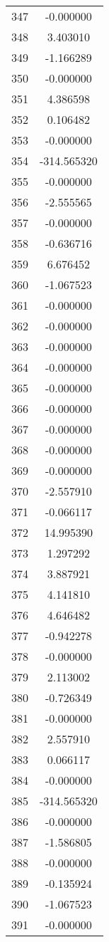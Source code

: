 \documentclass[12pt]{article}
\begin{document}
\begin{longtable}{@{}cc@{}}
347 & -0.000000 \\
348 & 3.403010 \\
349 & -1.166289 \\
350 & -0.000000 \\
351 & 4.386598 \\
352 & 0.106482 \\
353 & -0.000000 \\
354 & -314.565320 \\
355 & -0.000000 \\
356 & -2.555565 \\
357 & -0.000000 \\
358 & -0.636716 \\
359 & 6.676452 \\
360 & -1.067523 \\
361 & -0.000000 \\
362 & -0.000000 \\
363 & -0.000000 \\
364 & -0.000000 \\
365 & -0.000000 \\
366 & -0.000000 \\
367 & -0.000000 \\
368 & -0.000000 \\
369 & -0.000000 \\
370 & -2.557910 \\
371 & -0.066117 \\
372 & 14.995390 \\
373 & 1.297292 \\
374 & 3.887921 \\
375 & 4.141810 \\
376 & 4.646482 \\
377 & -0.942278 \\
378 & -0.000000 \\
379 & 2.113002 \\
380 & -0.726349 \\
381 & -0.000000 \\
382 & 2.557910 \\
383 & 0.066117 \\
384 & -0.000000 \\
385 & -314.565320 \\
386 & -0.000000 \\
387 & -1.586805 \\
388 & -0.000000 \\
389 & -0.135924 \\
390 & -1.067523 \\
391 & -0.000000 \\

\end{longtable}
\end{document}
